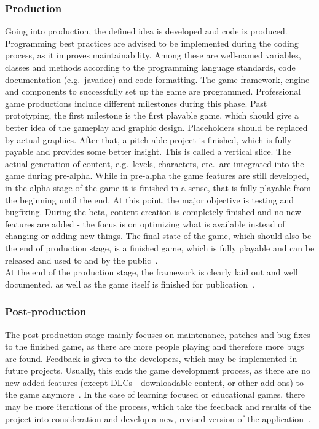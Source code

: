 \subsubsection{Production}\label{subsubsec:production}
Going into production, the defined idea is developed and code is produced.
Programming best practices are advised to be implemented during the coding process, as it improves maintainability.
Among these are well-named variables, classes and methods according to the programming language standards, code documentation (e.g.\ javadoc) and code formatting.
The game framework, engine and components to successfully set up the game are programmed.
Professional game productions include different milestones during this phase.
Past prototyping, the first milestone is the first playable game, which should give a better idea of the gameplay and graphic design.
Placeholders should be replaced by actual graphics.
After that, a pitch-able project is finished, which is fully payable and provides some better insight.
This is called a vertical slice.
The actual generation of content, e.g.\ levels, characters, etc.\ are integrated into the game during
pre-alpha.
While in pre-alpha the game features are still developed, in the alpha stage of the game it is finished in a sense, that is fully playable from the beginning
until the end.
At this point, the major objective is testing and bugfixing.
During the beta, content creation is completely finished and no new features are added - the focus is on optimizing what is available instead of
changing or adding new things.
The final state of the game, which should also be the end of production stage, is a finished game, which is fully playable and can be
released and used to and by the public~\cite{cg:game-design-stages}.
\\
At the end of the production stage, the framework is clearly laid out and well documented, as well as the game itself is finished for publication~\cite{GAMED}.

\subsubsection{Post-production}\label{subsubsec:post-production}
The post-production stage mainly focuses on maintenance, patches and bug fixes to the finished game, as there are more people playing and therefore more bugs
are found.
Feedback is given to the developers, which may be implemented in future projects.
Usually, this ends the game development process, as there are no new added features (except DLCs - downloadable content, or other add-ons) to the game anymore~\cite{cg:game-design-stages}.
In the case of learning focused or educational games, there may be more iterations of the process, which take the feedback and results of the project into
consideration and develop a new, revised version of the application~\cite{GAMED}.

